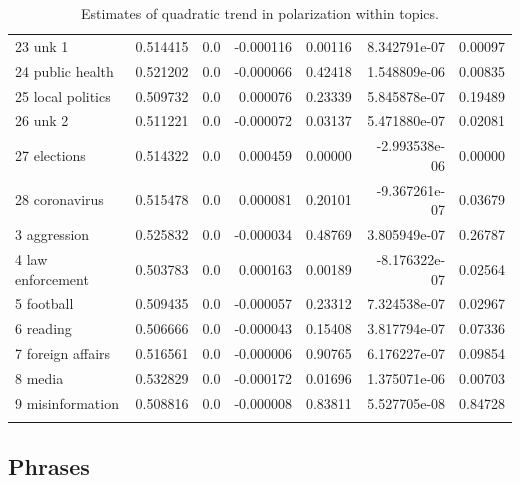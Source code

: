 \documentclass{article}
\begin{document}
\begin{longtable}{lrrrrrr}
	23 unk 1                   &  0.514415 &     0.0 &    -0.000116 &  0.00116 &    8.342791e-07 &  0.00097 \\
	24 public health           &  0.521202 &     0.0 &    -0.000066 &  0.42418 &    1.548809e-06 &  0.00835 \\
	25 local politics          &  0.509732 &     0.0 &     0.000076 &  0.23339 &    5.845878e-07 &  0.19489 \\
	26 unk 2                   &  0.511221 &     0.0 &    -0.000072 &  0.03137 &    5.471880e-07 &  0.02081 \\
	27 elections               &  0.514322 &     0.0 &     0.000459 &  0.00000 &   -2.993538e-06 &  0.00000 \\
	28 coronavirus             &  0.515478 &     0.0 &     0.000081 &  0.20101 &   -9.367261e-07 &  0.03679 \\
	3 aggression               &  0.525832 &     0.0 &    -0.000034 &  0.48769 &    3.805949e-07 &  0.26787 \\
	4 law enforcement          &  0.503783 &     0.0 &     0.000163 &  0.00189 &   -8.176322e-07 &  0.02564 \\
	5 football                 &  0.509435 &     0.0 &    -0.000057 &  0.23312 &    7.324538e-07 &  0.02967 \\
	6 reading                  &  0.506666 &     0.0 &    -0.000043 &  0.15408 &    3.817794e-07 &  0.07336 \\
	7 foreign affairs          &  0.516561 &     0.0 &    -0.000006 &  0.90765 &    6.176227e-07 &  0.09854 \\
	8 media                    &  0.532829 &     0.0 &    -0.000172 &  0.01696 &    1.375071e-06 &  0.00703 \\
	9 misinformation           &  0.508816 &     0.0 &    -0.000008 &  0.83811 &    5.527705e-08 &  0.84728 \\
	\bottomrule
	\caption{Estimates of quadratic trend in polarization within topics.}
	\label{tab:polarization_topics_ols_quadratic}
\end{longtable}



	\FloatBarrier
	
	\clearpage
	
	\subsection{Phrases}
	
\end{document}
